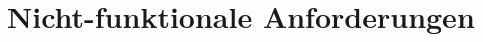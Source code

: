 \documentclass[../main.tex]{subfiles}
\begin{document}
	\section{Nicht-funktionale Anforderungen}
\end{document}
